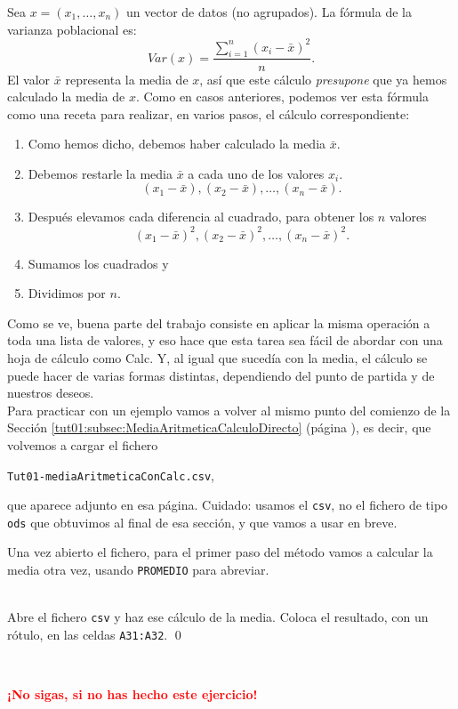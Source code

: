 \documentclass[10pt,a4paper]{article}\usepackage[]{graphicx}\usepackage[]{color}
\begin{document}
Sea $x=(x_1,\ldots,x_n)$ un vector de datos (no agrupados). La fórmula de la varianza poblacional es:
\[
Var(x)=\dfrac{\displaystyle\sum_{i=1}^n(x_i-\bar x)^2}{n}.
\]
El valor $\bar x$ representa la media de $x$, así que este cálculo {\em presupone} que ya hemos calculado la media de $x$. Como en casos anteriores, podemos ver esta fórmula como una receta para realizar, en varios pasos, el cálculo correspondiente:
\begin{enumerate}
  \item Como hemos dicho, debemos haber calculado la media $\bar x$.
  \item Debemos restarle la media $\bar x$ a cada uno de los valores $x_i$.
    \[(x_1-\bar x), (x_2-\bar x),\ldots, (x_n-\bar x).\]
  \item Después elevamos cada diferencia al cuadrado, para obtener los $n$ valores
  \[(x_1-\bar x)^2, (x_2-\bar x)^2,\ldots, (x_n-\bar x)^2.\]
  \item Sumamos los cuadrados y
  \item Dividimos por $n$.
\end{enumerate}
Como se ve, buena parte del trabajo consiste en aplicar la misma operación a toda una lista de valores, y eso hace que esta tarea sea fácil de abordar con una hoja de cálculo como Calc. Y, al igual que sucedía con la media, el cálculo se puede hacer de varias formas distintas, dependiendo del punto de partida y de nuestros deseos.\\

Para practicar con un ejemplo vamos a volver al mismo punto del comienzo de la Sección \ref{tut01:subsec:MediaAritmeticaCalculoDirecto} (página \pageref{tut01:subsec:MediaAritmeticaCalculoDirecto}), es decir, que volvemos a cargar el fichero
\begin{center}
{\tt Tut01-mediaAritmeticaConCalc.csv},
\end{center}
que aparece adjunto en esa página. Cuidado: usamos el {\tt csv}, no el fichero de tipo {\tt ods} que obtuvimos al final de esa sección, y que vamos a usar en breve.


Una vez abierto el fichero, para el primer paso del método vamos a calcular la media otra vez, usando {\tt PROMEDIO} para abreviar.
\begin{ejercicio}
\quad\\
Abre el fichero {\tt csv} y haz ese cálculo de la media. Coloca el resultado, con un rótulo, en las celdas {\tt A31:A32}.
\qed
\end{ejercicio}
\quad\\
\begin{center}
  \textcolor{red}{\LARGE\bf  ¡No sigas, si no has hecho este ejercicio!}
\end{center}
\end{document}
